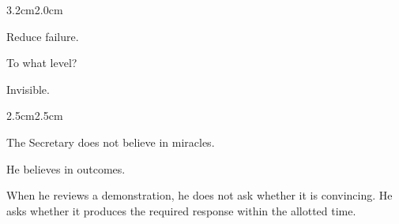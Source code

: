 \begin{adjustwidth}{3.2cm}{2.0cm}




\vspace{1em}

 Reduce failure.

\vspace{1em}

 To what level?

\vspace{1em}

 Invisible.

\vspace{2em}

\end{adjustwidth}

\begin{center}
\end{center}

\vspace{2em}

\begin{adjustwidth}{2.5cm}{2.5cm}

The Secretary does not believe in miracles.

\medskip

He believes in outcomes.

\medskip

When he reviews a demonstration, he does not ask whether it is convincing.
He asks whether it produces the required response within the allotted time.

\vspace{2em}


\vspace{2em}

\end{adjustwidth}
